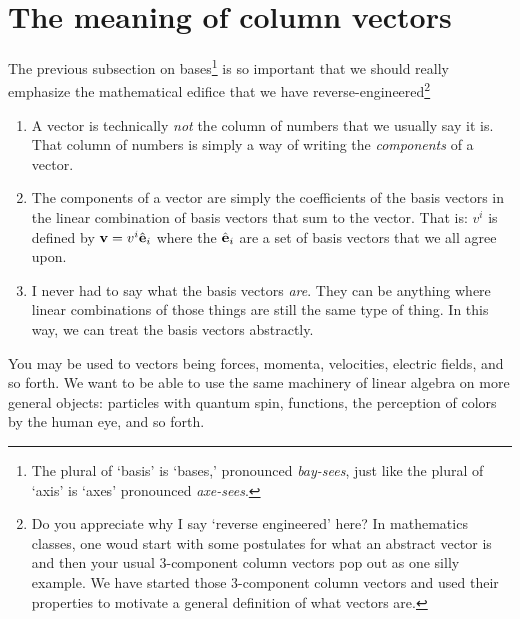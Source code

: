 \documentclass[12pt, oneside]{report}    %
\let\oldsection\section
\def\section{%
  \setcounter{sidenote}{1}%
  \oldsection
}
\begin{document}
\section{The meaning of column vectors}

The previous subsection on bases\footnote{The plural of `basis' is `bases,' pronounced \emph{bay-sees}, just like the plural of `axis' is `axes' pronounced \emph{axe-sees}.} is so important that we should really emphasize the mathematical edifice that we have reverse-engineered\footnote{Do you appreciate why I say `reverse engineered' here? In mathematics classes, one woud start with some postulates for what an abstract vector is and then your usual 3-component column vectors pop out as one silly example. We have started those 3-component column vectors and used their properties to motivate a general definition of what vectors are.}
\begin{enumerate}
    \item A vector is technically \emph{not} the column of numbers that we usually say it is. That column of numbers is simply a way of writing the \emph{components} of a vector.
    \item The components of a vector are simply the coefficients of the basis vectors in the linear combination of basis vectors that sum to the vector. That is: $v^i$ is defined by $\mathbf{v} = v^i {\hat{\mathbf{e}}}_i$ where the ${\hat{\mathbf{e}}}_i$ are a set of basis vectors that we all agree upon.
    \item I never had to say what the basis vectors \emph{are}. They can be anything where linear combinations of those things are still the same type of thing. In this way, we can treat the basis vectors abstractly.
\end{enumerate}
You may be used to vectors being forces, momenta, velocities, electric fields, and so forth. We want to be able to use the same machinery of linear algebra on more general objects: particles with quantum spin, functions, the perception of colors by the human eye, and so forth.
\end{document}
